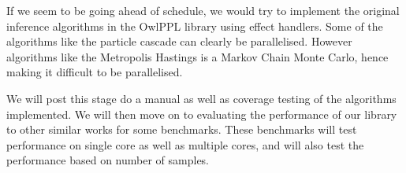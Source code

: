 \documentclass[12pt]{extarticle}
\begin{document}
If we seem to be going ahead of schedule, we would try to implement the original inference algorithms in the OwlPPL library using effect handlers. Some of the algorithms like the particle cascade can clearly be parallelised. However algorithms like the Metropolis Hastings is a Markov Chain Monte Carlo, hence making it difficult to be parallelised. 


 
 
 We will post this stage do a manual as well as coverage testing of the algorithms implemented. We will then move on to evaluating the performance of our library to other similar works for some benchmarks. These benchmarks will test performance on single core as well as multiple cores, and will also test the performance based on number of samples. 






\printbibliography
\end{document}

